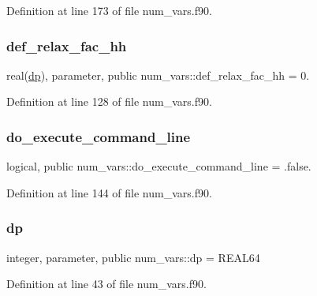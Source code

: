 Definition at line 173 of file num\+\_\+vars.\+f90.

\mbox{\label{namespacenum__vars_a9782d64dd6f481ae89e01228c46197ea}} 
\subsubsection{\texorpdfstring{def\+\_\+relax\+\_\+fac\+\_\+hh}{def\_relax\_fac\_hh}}
{\footnotesize\ttfamily real(\hyperlink{namespacenum__vars_a03802aa2bd86439d7a9370836fabf3f2}{dp}), parameter, public num\+\_\+vars\+::def\+\_\+relax\+\_\+fac\+\_\+hh = 0.}



Definition at line 128 of file num\+\_\+vars.\+f90.

\mbox{\label{namespacenum__vars_ad5ba241cde0a99cdd5b3d6a6c0340e5c}} 
\subsubsection{\texorpdfstring{do\+\_\+execute\+\_\+command\+\_\+line}{do\_execute\_command\_line}}
{\footnotesize\ttfamily logical, public num\+\_\+vars\+::do\+\_\+execute\+\_\+command\+\_\+line = .false.}



Definition at line 144 of file num\+\_\+vars.\+f90.

\mbox{\label{namespacenum__vars_a03802aa2bd86439d7a9370836fabf3f2}} 
\subsubsection{\texorpdfstring{dp}{dp}}
{\footnotesize\ttfamily integer, parameter, public num\+\_\+vars\+::dp = R\+E\+A\+L64}



Definition at line 43 of file num\+\_\+vars.\+f90.

